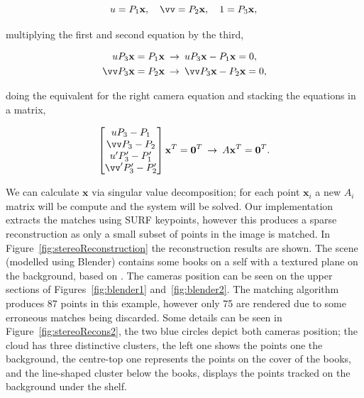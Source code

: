 \documentclass[12pt]{article}
\begin{document}
\begin{equation}
 u = P_1\mathbf{x}, \quad \vv = P_2\mathbf{x}, \quad 1 = P_3\mathbf{x},\\
\end{equation}

multiplying the first and second equation by the third,

\begin{equation}
\begin{aligned}
	uP_3\mathbf{x} &=  P_1\mathbf{x} \: \rightarrow  \: uP_3\mathbf{x} - P_1\mathbf{x} = 0,\\
	\vv P_3\mathbf{x} &= P_2\mathbf{x} \: \rightarrow \: \vv P_3\mathbf{x} - P_2\mathbf{x} = 0,
\end{aligned}
\end{equation}

doing the equivalent for the right camera equation and stacking the equations in a matrix,

\begin{equation}
	\begin{bmatrix}
	uP_3 - P_1 \\
	\vv P_3 - P_2 \\
	u'P_3' - P_1' \\
	\vv' P_3' - P_2'	
	\end{bmatrix}
	\mathbf{x}^T
	= \mathbf{0}^T \: \rightarrow  \: A\mathbf{x}^T = \mathbf{0}^T.
\end{equation}

We can calculate $\mathbf{x}$ via singular value decomposition; for each point $\mathbf{x}_i$ a new $A_i$ matrix will be compute and the system will be solved.
Our implementation extracts the matches using SURF keypoints, however this produces a sparse reconstruction as only a small subset of points in the image is matched.
In Figure~\ref{fig:stereoReconstruction} the reconstruction results are shown.
The scene (modelled using Blender) contains some books on a self with a textured plane on the background, based on \cite{Archemi2014}.
The cameras position can be seen on the upper sections of Figures~\ref{fig:blender1} and~\ref{fig:blender2}.
The matching algorithm produces 87 points in this example, however only 75 are rendered due to some erroneous matches being discarded.
Some details can be seen in Figure~\ref{fig:stereoRecons2}, the two blue circles depict both cameras position; the cloud has three distinctive clusters, the left one shows the points one the background, the centre-top one represents the points on the cover of the books, and the line-shaped cluster below the books, displays the points tracked on the background under the shelf.
\end{document}
